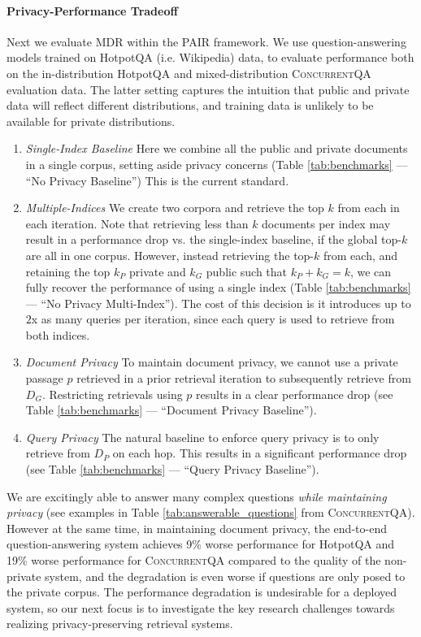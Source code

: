 \documentclass{article}
\newcommand{\datasetname}{\textsc{ConcurrentQA}\xspace}
\newcommand{\problemshortname}{\textsc{PAIR}\xspace}
\begin{document}
\paragraph{Privacy-Performance Tradeoff} Next we evaluate MDR within the \problemshortname framework. We use question-answering models trained on HotpotQA (i.e. Wikipedia) data, to evaluate performance both on the in-distribution HotpotQA and mixed-distribution \datasetname evaluation data. The latter setting captures the intuition that public and private data will reflect different distributions, and training data is unlikely to be available for private distributions.

\begin{enumerate}
\item \textit{Single-Index Baseline} Here we combine all the public and private documents in a single corpus, setting aside privacy concerns (Table \ref{tab:benchmarks} --- ``No Privacy Baseline'') This is the current standard.
\item \textit{Multiple-Indices} We create two corpora and retrieve the top $k$ from each in each iteration. Note that retrieving less than $k$ documents per index may result in a performance drop vs. the single-index baseline, if the global top-$k$ are all in one corpus. However, instead retrieving the top-$k$ from each, and retaining the top $k_P$ private and $k_G$ public such that $k_P+k_G = k$, we can fully recover the performance of using a single index (Table \ref{tab:benchmarks} --- ``No Privacy Multi-Index'').  The cost of this decision is it introduces up to $2$x as many queries per iteration, since each query is used to retrieve from both indices.
\item \textit{Document Privacy} To maintain document privacy, we cannot use a private passage $p$ retrieved in a prior retrieval iteration to subsequently retrieve from $D_G$. 
Restricting retrievals using $p$ results in a clear performance drop (see Table \ref{tab:benchmarks} --- ``Document Privacy Baseline''). 

\item \textit{Query Privacy} The natural baseline to enforce query privacy is to only retrieve from $D_P$ on each hop. This results in a significant performance drop (see Table \ref{tab:benchmarks} --- ``Query Privacy Baseline'').
\end{enumerate}

We are excitingly able to answer many complex questions \textit{while maintaining privacy} (see examples in Table \ref{tab:answerable_questions} from \datasetname). However at the same time, in maintaining document privacy, the end-to-end question-answering system achieves 9\% worse performance for HotpotQA and 19\% worse performance for \datasetname compared to the quality of the non-private system, and the degradation is even worse if questions are only posed to the private corpus. The performance degradation is undesirable for a deployed system, so our next focus is to investigate the key research challenges towards realizing privacy-preserving retrieval systems. 
\end{document}
